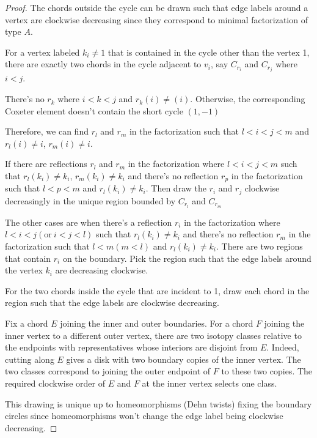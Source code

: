 \documentclass[11pt]{amsart}
\begin{document}
\begin{proof}
    The chords outside the cycle can be drawn such that edge labels around a vertex are clockwise decreasing since they correspond to minimal factorization of type $A$.

    For a vertex labeled $k_i \neq 1$ that is contained in the cycle other than the vertex 1, there are exactly two chords in the cycle adjacent to $v_i$, say $C_{r_i}$ and $C_{r_j}$ where $i < j$. 

    There's no $r_k$ where $i < k < j$ and $r_k(i) \neq (i)$. Otherwise, the corresponding Coxeter element doesn't contain the short cycle $(1,-1)$

    Therefore, we can find $r_l$ and $r_m$ in the factorization such that $l < i < j < m$ and $r_l(i) \neq i$, $r_m(i) \neq i$.

    If there are reflections $r_l$ and $r_m$ in the factorization where $l < i < j < m$ such that $r_l(k_i) \neq k_i$, $r_m(k_i) \neq k_i$ and there's no reflection $r_p$ in the factorization such that $l < p < m$ and $r_l(k_i) \neq k_i$. Then draw the $r_i$ and $r_j$ clockwise decreasingly in the unique region bounded by  $C_{r_l}$ and $C_{r_m}$

    The other cases are when there's a reflection $r_i$ in the factorization where $l < i < j (\text{or} \ i < j < l)$ such that $r_l(k_i) \neq k_i$ and there's no reflection $r_m$ in the factorization such that $l < m (m < l )$ and $r_l(k_i) \neq k_i$. There are two regions that contain $r_i$ on the boundary. Pick the region such that the edge labels around the vertex $k_i$ are decreasing clockwise.

    For the two chords inside the cycle that are incident to 1, draw each chord in the region such that the edge labels are clockwise decreasing.

    Fix a chord $E$ joining the inner and outer boundaries.
    For a chord $F$ joining the inner vertex to a different
    outer vertex, there are two isotopy classes relative
    to the endpoints with representatives whose interiors
    are disjoint from $E$. Indeed, cutting along $E$ gives
    a disk with two boundary copies of the inner vertex.
    The two classes correspond to joining the outer endpoint
    of $F$ to these two copies. The required clockwise order
    of $E$ and $F$ at the inner vertex selects one class.

    This drawing is unique up to homeomorphisms (Dehn twists) fixing the boundary circles since homeomorphisms won't change the edge label being clockwise decreasing.
\end{proof}
\end{document}
